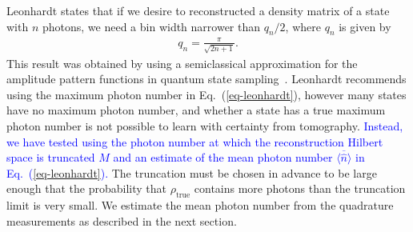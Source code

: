 \documentclass[
reprint,
superscriptaddress,
showpacs,
amsmath,
amssymb,
aps,
pra,
longbibliography
]{revtex4-1}
\providecommand{\editcolor}[2]{\textcolor{#1}{#2}}
\providecommand{\editcolor}[2]{#2}
\newcommand{\HV}[1]{\editcolor{blue}{#1}}
\newcommand{\rhotrue}{\rho_{\text{true}}}
\begin{document}
Leonhardt states that if we desire to reconstructed a density matrix of a 
state with $n$ photons, we need a bin width narrower than $q_n/2$, 
where $q_n$ is given by
\begin{eqnarray}
  q_n = \frac{\pi}{\sqrt{2 n + 1}}.
  \label{eq-leonhardt}
\end{eqnarray}
This result was obtained by using a semiclassical approximation for the amplitude
pattern functions in quantum state sampling~\cite{Leonhardt1996}. Leonhardt 
recommends using the maximum photon number in Eq.~(\ref{eq-leonhardt}), however
many states have no maximum photon number, and whether a state has a
true maximum photon number is not possible to learn with certainty
from tomography.  \HV{Instead, we have tested using the photon number at
which the reconstruction Hilbert space is truncated $M$ and an estimate 
of the mean photon number $\overline{\langle \hat{n} \rangle}$ in 
Eq.~(\ref{eq-leonhardt}).} The truncation must be chosen
in advance to be large enough that the probability that $\rhotrue$
contains more photons than the truncation limit is very small.  We
estimate the mean photon number from the quadrature measurements as
described in the next section.
\end{document}

